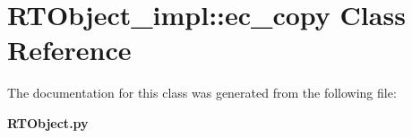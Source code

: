 \section{RTObject\_\-impl::ec\_\-copy Class Reference}
\label{classRTObject__impl_1_1ec__copy}


The documentation for this class was generated from the following file:\begin{CompactItemize}
\item 
{\bf RTObject.py}\end{CompactItemize}
